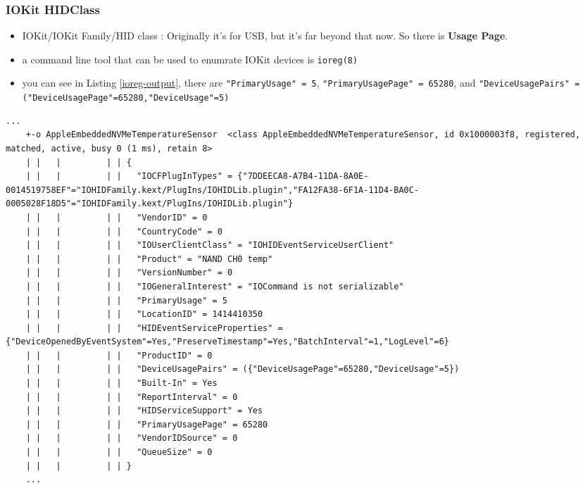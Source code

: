 \documentclass{beamer}
\begin{document}
\begin{frame}
  \frametitle{IOKit HIDClass}
  \begin{itemize}
  \item IOKit/IOKit Family/HID class \cite{iokit:family}: Originally it's for USB, but it's far beyond that now. So there is \textbf{Usage Page}.
  \item a command line tool that can be used to enumrate IOKit devices is \texttt{ioreg(8)}
  \item you can see in Listing \ref{ioreg-output}, there are \texttt{"PrimaryUsage" = 5}, \texttt{"PrimaryUsagePage" = 65280}, and \texttt{"DeviceUsagePairs" = ({"DeviceUsagePage"=65280,"DeviceUsage"=5})}
  \end{itemize}
  
  \begin{adjustbox}{varwidth=\maxdimen,max width=\linewidth,keepaspectratio}
    \begin{lstlisting}[caption={Example TemperatureSensor in \texttt{ioreg} output}, label={ioreg-output}]
    ...
    +-o AppleEmbeddedNVMeTemperatureSensor  <class AppleEmbeddedNVMeTemperatureSensor, id 0x1000003f8, registered, matched, active, busy 0 (1 ms), retain 8>
    | |   |         | | {
    | |   |         | |   "IOCFPlugInTypes" = {"7DDEECA8-A7B4-11DA-8A0E-0014519758EF"="IOHIDFamily.kext/PlugIns/IOHIDLib.plugin","FA12FA38-6F1A-11D4-BA0C-0005028F18D5"="IOHIDFamily.kext/PlugIns/IOHIDLib.plugin"}
    | |   |         | |   "VendorID" = 0
    | |   |         | |   "CountryCode" = 0
    | |   |         | |   "IOUserClientClass" = "IOHIDEventServiceUserClient"
    | |   |         | |   "Product" = "NAND CH0 temp"
    | |   |         | |   "VersionNumber" = 0
    | |   |         | |   "IOGeneralInterest" = "IOCommand is not serializable"
    | |   |         | |   "PrimaryUsage" = 5
    | |   |         | |   "LocationID" = 1414410350
    | |   |         | |   "HIDEventServiceProperties" = {"DeviceOpenedByEventSystem"=Yes,"PreserveTimestamp"=Yes,"BatchInterval"=1,"LogLevel"=6}
    | |   |         | |   "ProductID" = 0
    | |   |         | |   "DeviceUsagePairs" = ({"DeviceUsagePage"=65280,"DeviceUsage"=5})
    | |   |         | |   "Built-In" = Yes
    | |   |         | |   "ReportInterval" = 0
    | |   |         | |   "HIDServiceSupport" = Yes
    | |   |         | |   "PrimaryUsagePage" = 65280
    | |   |         | |   "VendorIDSource" = 0
    | |   |         | |   "QueueSize" = 0
    | |   |         | | }
    ...
    \end{lstlisting}
  \end{adjustbox}

\end{frame}
\end{document}
